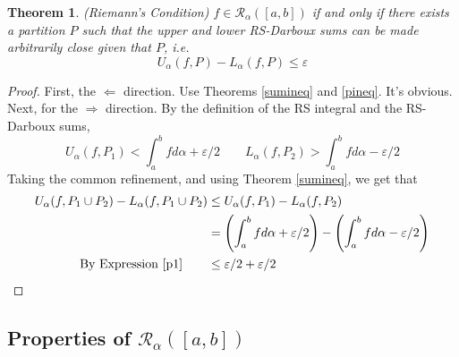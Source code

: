 \documentclass[12pt]{article}
\theoremstyle{plain}
\newtheorem{thm}{Theorem}[subsection]
\theoremstyle{definition}
\theoremstyle{remark}
\begin{document}
\begin{thm}
\emph{(Riemann's Condition)}
\label{riemcond}
$f \in \mathscr{R}_\alpha([a,b])$ if and only if there exists a partition $P$ such that the upper and lower RS-Darboux sums can be made arbitrarily close given that $P$, i.e.
    \[  U_\alpha(f,P) - L_\alpha(f,P) \leq \varepsilon \]
\end{thm}
\begin{proof} First, the $\Leftarrow$ direction. Use Theorems \ref{sumineq} and \ref{pineq}. It's obvious. Next, for the $\Rightarrow$ direction. By the definition of the RS integral and the RS-Darboux sums, 
\begin{equation}
    \label{p1}
    U_\alpha(f,P_1) < \int^b_a f d\alpha + \varepsilon/2 \qquad
    L_\alpha(f,P_2) > \int^b_a f d\alpha - \varepsilon/2
\end{equation}
Taking the common refinement, and using Theorem \ref{sumineq}, we get that 
\begin{align*}
    U_\alpha(f,P_1 \cup P_2) - L_\alpha(f,P_1 \cup P_2) &\leq 
    U_\alpha(f,P_1) - L_\alpha(f,P_2) \\
    &= \left(\int^b_a f d\alpha + \varepsilon/2\right) - 
        \left(\int^b_a f d\alpha -\varepsilon/2  \right) \\
    \text{By Expression \ref{p1}}\qquad &\leq \varepsilon/2 + \varepsilon/2
\end{align*}
\end{proof}

\subsection{Properties of $\mathscr{R}_\alpha([a,b])$}
\end{document}
